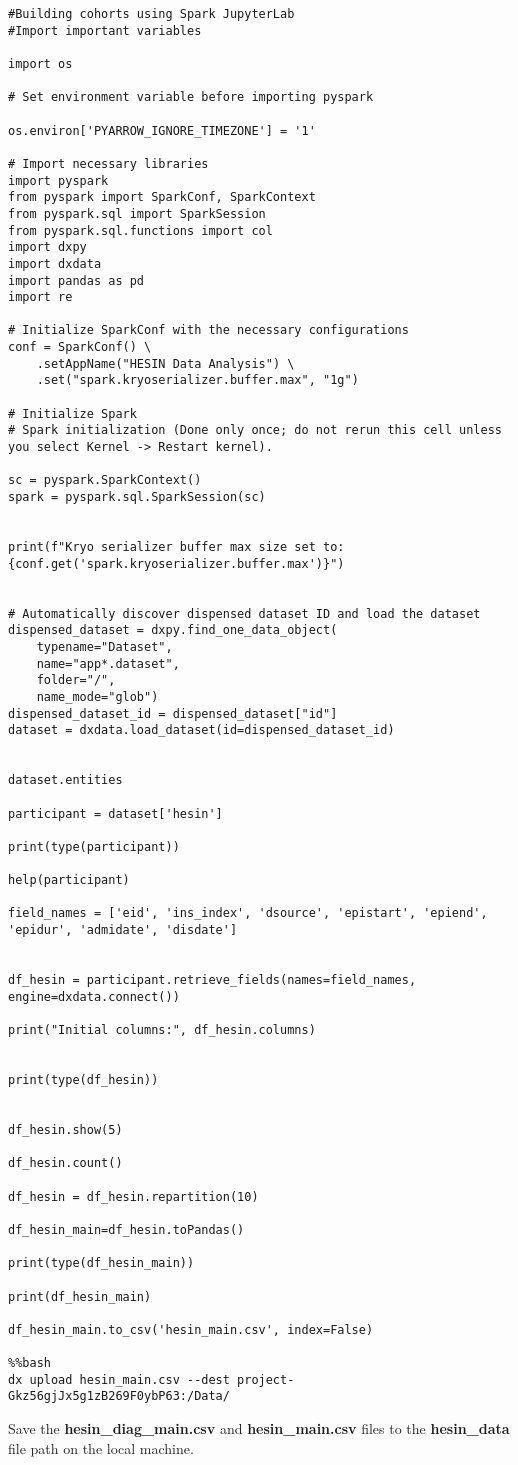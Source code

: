\documentclass[11pt]{article}
\begin{document}
\begin{lstlisting}[style=PythonStyle]
#Building cohorts using Spark JupyterLab
#Import important variables

import os

# Set environment variable before importing pyspark

os.environ['PYARROW_IGNORE_TIMEZONE'] = '1'

# Import necessary libraries
import pyspark
from pyspark import SparkConf, SparkContext
from pyspark.sql import SparkSession
from pyspark.sql.functions import col
import dxpy
import dxdata
import pandas as pd
import re

# Initialize SparkConf with the necessary configurations
conf = SparkConf() \
    .setAppName("HESIN Data Analysis") \
    .set("spark.kryoserializer.buffer.max", "1g")

# Initialize Spark
# Spark initialization (Done only once; do not rerun this cell unless you select Kernel -> Restart kernel).

sc = pyspark.SparkContext()
spark = pyspark.sql.SparkSession(sc)


print(f"Kryo serializer buffer max size set to: {conf.get('spark.kryoserializer.buffer.max')}")


# Automatically discover dispensed dataset ID and load the dataset
dispensed_dataset = dxpy.find_one_data_object(
    typename="Dataset", 
    name="app*.dataset", 
    folder="/", 
    name_mode="glob")
dispensed_dataset_id = dispensed_dataset["id"]
dataset = dxdata.load_dataset(id=dispensed_dataset_id)


dataset.entities

participant = dataset['hesin']

print(type(participant))

help(participant)

field_names = ['eid', 'ins_index', 'dsource', 'epistart', 'epiend', 'epidur', 'admidate', 'disdate']


df_hesin = participant.retrieve_fields(names=field_names, engine=dxdata.connect())

print("Initial columns:", df_hesin.columns)


print(type(df_hesin))


df_hesin.show(5)

df_hesin.count()

df_hesin = df_hesin.repartition(10)

df_hesin_main=df_hesin.toPandas()

print(type(df_hesin_main))

print(df_hesin_main)

df_hesin_main.to_csv('hesin_main.csv', index=False)

%%bash
dx upload hesin_main.csv --dest project-Gkz56gjJx5g1zB269F0ybP63:/Data/
\end{lstlisting}
\color{black}
Save the \textbf{hesin\_diag\_main.csv} and \textbf{hesin\_main.csv} files to the \textbf{hesin\_data} file path on the local machine.
\end{document}
